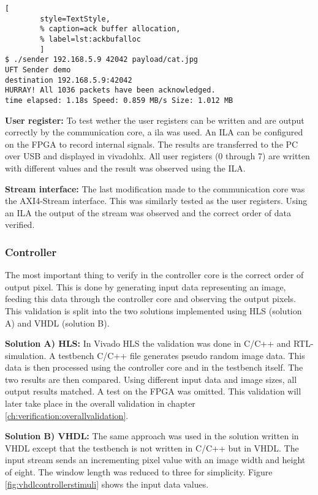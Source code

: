 \begin{minipage}{1\linewidth}
    \begin{lstlisting}[
        style=TextStyle, 
        % caption=ack buffer allocation, 
        % label=lst:ackbufalloc
        ]
$ ./sender 192.168.5.9 42042 payload/cat.jpg
UFT Sender demo
destination 192.168.5.9:42042
HURRAY! All 1036 packets have been acknowledged.
time elapsed: 1.18s Speed: 0.859 MB/s Size: 1.012 MB\end{lstlisting}
\end{minipage}

\vspace{1ex}
\textbf{User register:} To test wether the user registers can be written and are
output correctly by the communication core, a \gls{ila} 
was used. An ILA can be configured on the FPGA to record internal signals. The
results are transferred to the PC over USB and displayed in \gls{vivadohlx}. All
user registers (0 through 7) are written with different values and the result
was observed using the ILA.

\vspace{1ex}
\textbf{Stream interface:} The last modification made to the communication core
was the AXI4-Stream interface. This was similarly tested as the user registers.
Using an ILA the output of the stream was observed and the correct order of data
verified. 

\subsubsection*{Controller} 
The most important thing to verify in the controller core is the correct order
of output pixel. This is done by generating input data representing an image,
feeding this data through the controller core and observing the output pixels.
This validation is split into the two solutions implemented using HLS (solution
A) and VHDL (solution B).

\vspace{1ex}
\textbf{Solution A) HLS:} In Vivado HLS the validation was done in C/C++ and
RTL-simulation. A testbench C/C++ file generates pseudo random image data. This
data is then processed using the controller core and in the testbench itself.
The two results are then compared. Using different input data and image sizes,
all output results matched. A test on the FPGA was omitted. This validation will
later take place in the overall validation in chapter \ref{ch:verification:overallvalidation}.

\vspace{1ex}
\textbf{Solution B) VHDL:} The same approach was used in the solution written in
VHDL except that the testbench is not written in C/C++ but in VHDL. The input
stream sends an incrementing pixel value with an image width and height of
eight. The window length was reduced to three for simplicity. Figure 
\ref{fig:vhdlcontrollerstimuli} shows the input data values.

